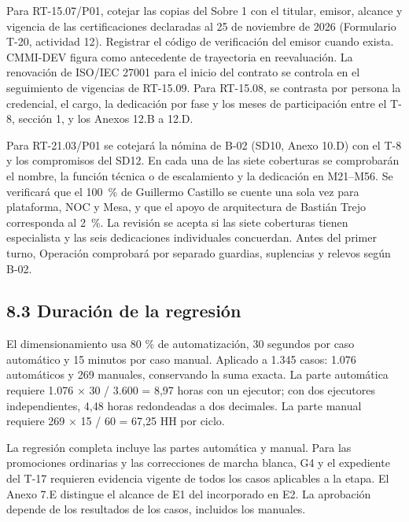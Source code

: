 Para RT-15.07/P01, cotejar las copias del Sobre 1 con el titular, emisor, alcance y vigencia de las certificaciones declaradas al 25 de noviembre de 2026 (Formulario T-20, actividad 12). Registrar el código de verificación del emisor cuando exista. CMMI-DEV figura como antecedente de trayectoria en reevaluación. La renovación de ISO/IEC 27001 para el inicio del contrato se controla en el seguimiento de vigencias de RT-15.09. Para RT-15.08, se contrasta por persona la credencial, el cargo, la dedicación por fase y los meses de participación entre el T-8, sección 1, y los Anexos 12.B a 12.D.

Para RT-21.03/P01 se cotejará la nómina de B-02 (SD10, Anexo 10.D) con el T-8 y los compromisos del SD12. En cada una de las siete coberturas se comprobarán el nombre, la función técnica o de escalamiento y la dedicación en M21--M56. Se verificará que el 100~\% de Guillermo Castillo se cuente una sola vez para plataforma, NOC y Mesa, y que el apoyo de arquitectura de Bastián Trejo corresponda al 2~\%. La revisión se acepta si las siete coberturas tienen especialista y las seis dedicaciones individuales concuerdan. Antes del primer turno, Operación comprobará por separado guardias, suplencias y relevos según B-02.



\subsection*{8.3 Duración de la regresión}

El dimensionamiento usa 80 \% de automatización, 30 segundos por caso automático y 15 minutos por caso manual. Aplicado a 1.345 casos: 1.076 automáticos y 269 manuales, conservando la suma exacta. La parte automática requiere 1.076 × 30 / 3.600 = 8,97 horas con un ejecutor; con dos ejecutores independientes, 4,48 horas redondeadas a dos decimales. La parte manual requiere 269 × 15 / 60 = 67,25 HH por ciclo.

La regresión completa incluye las partes automática y manual. Para las promociones ordinarias y las correcciones de marcha blanca, G4 y el expediente del T-17 requieren evidencia vigente de todos los casos aplicables a la etapa. El Anexo 7.E distingue el alcance de E1 del incorporado en E2. La aprobación depende de los resultados de los casos, incluidos los manuales.

